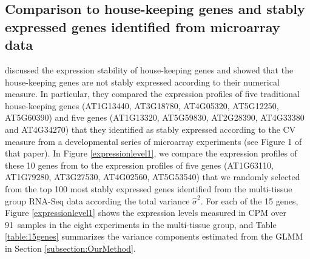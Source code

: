 \documentclass[fleqn,10pt,lineno]{wlpeerj} %
\newcommand{\howmanytissuesample}{91~}
\newcommand{\SelectFiveGene}{AT1G63110, AT1G79280, AT3G27530, AT4G02560, AT5G53540}
\begin{document}
	
	
	\subsection{Comparison to house-keeping genes and stably expressed genes
		identified from microarray data}\label{section:CompareStablyExpressedGene}
	\citeauthor{czechowski2005genome} discussed the expression stability of
	house-keeping genes and showed that the house-keeping genes are not stably
	expressed according to their numerical measure. In particular, they compared
	the expression profiles of five traditional house-keeping genes (AT1G13440,
	AT3G18780, AT4G05320, AT5G12250, AT5G60390) and five genes (AT1G13320,
	AT5G59830, AT2G28390, AT4G33380 and AT4G34270) that they identified  as stably
	expressed according to the CV measure from a developmental series of
	microarray experiments (see Figure 1 of that paper).  
	In Figure \ref{expressionlevel1}, we compare the expression profiles 
	of these 10 genes from \citeauthor{czechowski2005genome} to the expression profiles
	of five genes (\SelectFiveGene) that we
	randomly selected from the top 100 most stably expressed genes identified from
	the multi-tissue group RNA-Seq data according the total variance $\hat\sigma^2$.
	For each of the 15 genes, Figure \ref{expressionlevel1} shows the expression levels measured
	in CPM over \howmanytissuesample samples in the eight experiments in the multi-tissue group,
	and Table \ref{table:15genes} summarizes the variance components estimated from the
	GLMM in Section \ref{subsection:OurMethod}. 
	
\end{document}

